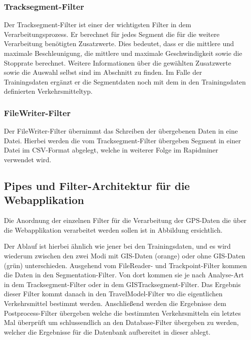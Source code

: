 \subsubsection{Tracksegment-Filter}
\label{tracksegmentFilter}
Der Tracksegment-Filter ist einer der wichtigsten Filter in dem Verarbeitungsprozess. Er berechnet für jedes Segment die für die weitere Verarbeitung benötigten Zusatzwerte. Dies bedeutet, dass er die mittlere und maximale Beschleunigung, die mittlere und maximale Geschwindigkeit sowie die Stopprate berechnet. Weitere Informationen über die gewählten Zusatzwerte sowie die Auswahl selbst sind im Abschnitt  zu finden.  Im Falle der Trainingsdaten ergänzt er die Segmentdaten noch mit dem in den Trainingsdaten definierten Verkehrsmitteltyp.

\subsubsection{FileWriter-Filter}
Der FileWriter-Filter übernimmt das Schreiben der übergebenen Daten in eine Datei. Hierbei werden die vom Tracksegment-Filter übergeben Segment in einer Datei im CSV-Format abgelegt, welche in weiterer Folge im Rapidminer verwendet wird.

\subsection{Pipes und Filter-Architektur für die Webapplikation}
Die Anordnung der einzelnen Filter für die Verarbeitung der GPS-Daten die über die Webapplikation verarbeitet werden sollen ist in Abbildung  ersichtlich. 

Der Ablauf ist hierbei ähnlich wie jener bei den Trainingsdaten, und es wird wiederum zwischen den zwei Modi mit GIS-Daten (orange) oder ohne GIS-Daten (grün) unterschieden. Ausgehend vom FileReader- und Trackpoint-Filter kommen die Daten in den Segmentation-Filter. Von dort kommen sie je nach Analyse-Art in dem Tracksegment-Filter oder in dem GISTracksegment-Filter. Das Ergebnis dieser Filter kommt danach in den TravelModel-Filter wo die eigentlichen Verkehrsmittel bestimmt werden. Anschließend werden die Ergebnisse dem Postprocess-Filter übergeben welche die bestimmten Verkehrsmitteln ein letztes Mal überprüft um schlussendlich an den Database-Filter übergeben zu werden, welcher die Ergebnisse für die Datenbank aufbereitet in dieser ablegt.


